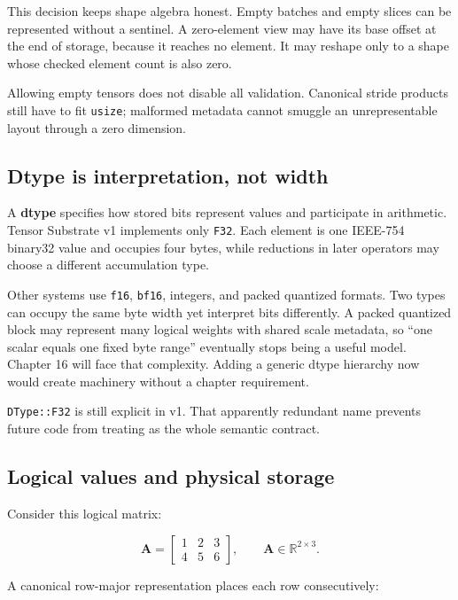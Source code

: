 \documentclass[
  10pt,
]{article}
\begin{document}
This decision keeps shape algebra honest. Empty batches and empty slices
can be represented without a sentinel. A zero-element view may have its
base offset at the end of storage, because it reaches no element. It may
reshape only to a shape whose checked element count is also zero.

Allowing empty tensors does not disable all validation. Canonical stride
products still have to fit \texttt{usize}; malformed metadata cannot
smuggle an unrepresentable layout through a zero dimension.

\subsection{Dtype is interpretation, not
width}\label{dtype-is-interpretation-not-width}

A \textbf{dtype} specifies how stored bits represent values and
participate in arithmetic. Tensor Substrate v1 implements only
\texttt{F32}. Each element is one IEEE-754 binary32 value and occupies
four bytes, while reductions in later operators may choose a different
accumulation type.

Other systems use \texttt{f16}, \texttt{bf16}, integers, and packed
quantized formats. Two types can occupy the same byte width yet
interpret bits differently. A packed quantized block may represent many
logical weights with shared scale metadata, so ``one scalar equals one
fixed byte range'' eventually stops being a useful model. Chapter 16
will face that complexity. Adding a generic dtype hierarchy now would
create machinery without a chapter requirement.

\texttt{DType::F32} is still explicit in v1. That apparently redundant
name prevents future code from treating
\texttt{} as the whole semantic contract.

\subsection{Logical values and physical
storage}\label{logical-values-and-physical-storage}

Consider this logical matrix:

\[
\mathbf{A} =
\begin{bmatrix}
1 & 2 & 3 \\
4 & 5 & 6
\end{bmatrix},
\qquad \mathbf{A}\in\mathbb{R}^{2\times3}.
\]

A canonical row-major representation places each row consecutively:
\end{document}
